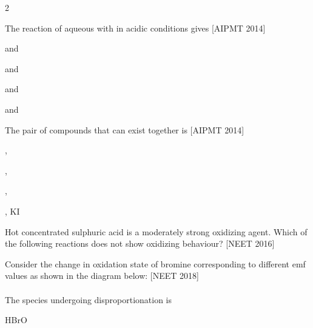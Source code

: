 \documentclass[10pt,a4paper]{article}
\begin{document}
\begin{multicols}{2}
\begin{questions}[start=1]
\item The reaction of aqueous  with  in acidic conditions gives \hfill [AIPMT 2014]
\begin{options}
  \item {} and 
  \item {} and 
  \item {} and 
  \item {} and 
\end{options}

\item The pair of compounds that can exist together is \hfill [AIPMT 2014]
\begin{options}
  \item {}, 
  \item {}, 
  \item {}, 
  \item {}, KI
\end{options}

\item Hot concentrated sulphuric acid is a moderately strong oxidizing agent. Which of the following reactions does not show oxidizing behaviour? \hfill [NEET 2016]
\begin{options}
  \item {}
  \item {}
  \item {}
  \item {}
\end{options}

\item Consider the change in oxidation state of bromine corresponding to different emf values as shown in the diagram below: \hfill [NEET 2018]\\
\\
The species undergoing disproportionation is
\begin{options}
  \item {}
  \item {}
  \item {}
  \item HBrO
\end{options}


\end{questions}
\end{multicols}
\end{document}
